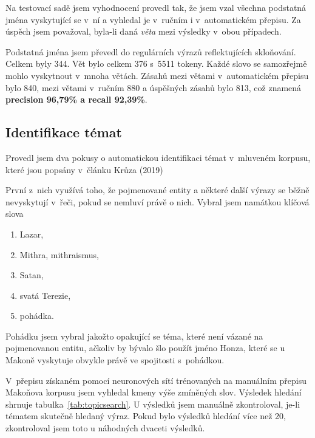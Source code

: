 Na testovací sadě jsem vyhodnocení provedl tak, že jsem vzal všechna podstatná
jména vyskytující se v~ní a vyhledal je v~ručním i v~automatickém přepisu.
Za úspěch jsem považoval, byla-li daná {\em věta} mezi výsledky v~obou
případech.

Podstatná jména jsem převedl do regulárních výrazů reflektujících skloňování.
Celkem byly 344. Vět bylo celkem 376 s~5511 tokeny. Každé slovo se samozřejmě
mohlo vyskytnout v~mnoha větách. Zásahů mezi větami v~automatickém přepisu bylo
840, mezi větami v~ručním 880 a úspěšných zásahů bylo 813, což znamená \textbf{precision
96,79\% a recall 92,39\%}.

\subsection{Identifikace témat}
\label{ssec:data:topicsearch}

Provedl jsem dva pokusy o automatickou identifikaci témat
v~mluveném korpusu, které jsou popsány v~článku Krůza (2019)\cite{kruza2019spoken}

První z~nich využívá toho, že pojmenované entity a některé další výrazy se běžně
nevyskytují v~řeči, pokud se nemluví právě o nich. Vybral jsem namátkou klíčová
slova
\begin{enumerate}
\item{Lazar,}
\item{Mithra, mithraismus,}
\item{Satan,}
\item{svatá Terezie,}
\item{pohádka.}
\end{enumerate}

Pohádku jsem vybral jakožto opakující se téma, které není vázané na pojmenovanou
entitu, ačkoliv by bývalo šlo použít jméno Honza, které se u Makoně vyskytuje
obvykle právě ve spojitosti s~pohádkou.

V~přepisu %
získaném pomocí neuronových sítí trénovaných na manuálním přepisu Makoňova korpusu jsem vyhledal kmeny
výše zmíněných slov. Výsledek hledání shrnuje tabulka~\ref{tab:topicsearch}.
U výsledků jsem manuálně zkontroloval, je-li tématem skutečně hledaný výraz.
Pokud bylo výsledků hledání více než 20, zkontroloval jsem toto u náhodných
dvaceti výsledků.

